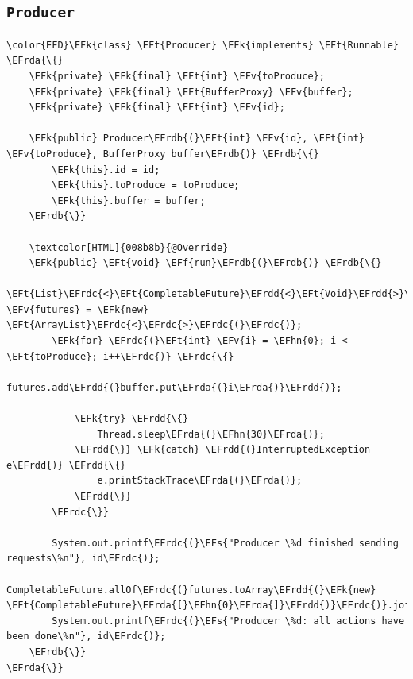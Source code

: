 \documentclass[11pt]{article}
\newcommand{\EFs}[1]{\textcolor{EFs}{#1}} %
\newcommand{\EFk}[1]{\textcolor{EFk}{#1}} %
\newcommand{\EFf}[1]{\textcolor{EFf}{#1}} %
\newcommand{\EFv}[1]{\textcolor{EFv}{#1}} %
\newcommand{\EFt}[1]{\textcolor{EFt}{#1}} %
\newcommand{\EFhn}[1]{\textcolor{EFhn}{#1}} %
\newcommand{\EFrda}[1]{\textcolor{EFrda}{#1}} %
\newcommand{\EFrdb}[1]{\textcolor{EFrdb}{#1}} %
\newcommand{\EFrdc}[1]{\textcolor{EFrdc}{#1}} %
\newcommand{\EFrdd}[1]{\textcolor{EFrdd}{#1}} %
\begin{document}
\subsection*{\texttt{Producer}}
\label{sec:org5d9b6e9}
\begin{Code}
\begin{Verbatim}
\color{EFD}\EFk{class} \EFt{Producer} \EFk{implements} \EFt{Runnable} \EFrda{\{}
    \EFk{private} \EFk{final} \EFt{int} \EFv{toProduce};
    \EFk{private} \EFk{final} \EFt{BufferProxy} \EFv{buffer};
    \EFk{private} \EFk{final} \EFt{int} \EFv{id};

    \EFk{public} Producer\EFrdb{(}\EFt{int} \EFv{id}, \EFt{int} \EFv{toProduce}, BufferProxy buffer\EFrdb{)} \EFrdb{\{}
        \EFk{this}.id = id;
        \EFk{this}.toProduce = toProduce;
        \EFk{this}.buffer = buffer;
    \EFrdb{\}}

    \textcolor[HTML]{008b8b}{@Override}
    \EFk{public} \EFt{void} \EFf{run}\EFrdb{(}\EFrdb{)} \EFrdb{\{}
        \EFt{List}\EFrdc{<}\EFt{CompletableFuture}\EFrdd{<}\EFt{Void}\EFrdd{>}\EFrdc{>} \EFv{futures} = \EFk{new} \EFt{ArrayList}\EFrdc{<}\EFrdc{>}\EFrdc{(}\EFrdc{)};
        \EFk{for} \EFrdc{(}\EFt{int} \EFv{i} = \EFhn{0}; i < \EFt{toProduce}; i++\EFrdc{)} \EFrdc{\{}
            futures.add\EFrdd{(}buffer.put\EFrda{(}i\EFrda{)}\EFrdd{)};

            \EFk{try} \EFrdd{\{}
                Thread.sleep\EFrda{(}\EFhn{30}\EFrda{)};
            \EFrdd{\}} \EFk{catch} \EFrdd{(}InterruptedException e\EFrdd{)} \EFrdd{\{}
                e.printStackTrace\EFrda{(}\EFrda{)};
            \EFrdd{\}}
        \EFrdc{\}}

        System.out.printf\EFrdc{(}\EFs{"Producer \%d finished sending requests\%n"}, id\EFrdc{)};
        CompletableFuture.allOf\EFrdc{(}futures.toArray\EFrdd{(}\EFk{new} \EFt{CompletableFuture}\EFrda{[}\EFhn{0}\EFrda{]}\EFrdd{)}\EFrdc{)}.join\EFrdc{(}\EFrdc{)};
        System.out.printf\EFrdc{(}\EFs{"Producer \%d: all actions have been done\%n"}, id\EFrdc{)};
    \EFrdb{\}}
\EFrda{\}}
\end{Verbatim}
\end{Code}
\end{document}
